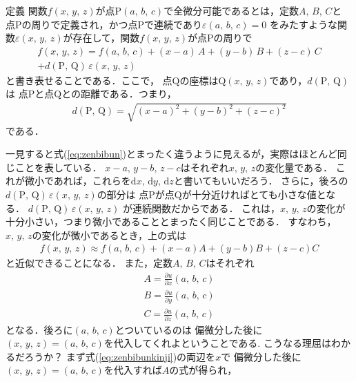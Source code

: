 \begin{itembox}[l]{定義}
関数$f(x, \, y, \, z)$が点$\mathrm{P}(a, \, b, \, c)$で全微分可能であるとは，定数$A, \, B, \, C$と
点$\mathrm{P}$の周りで定義され，かつ点$\mathrm{P}$で連続であり$\varepsilon(a, \, b, \, c)=0$
をみたすような関数$\varepsilon(x, \, y, \, z)$が存在して，関数$f(x, \, y, \, z)$が点$\mathrm{P}$の周りで
\begin{align*}
f(x, \, y, \, z) = f(a, \, b, \, c) + (x- a) \, A + (y-b) \, B + (z-c) \, C \\
+ d (\mathrm{P}, \, \mathrm{Q}) \,  \varepsilon(x, \, y, \, z)
\end{align*}
と書き表せることである．ここで，
点$\mathrm{Q}$の座標は$\mathrm{Q}(x, \, y, \, z)$であり，$d(\mathrm{P}, \, \mathrm{Q})$は
点$\mathrm{P}$と点$\mathrm{Q}$との距離である．つまり，
\begin{align*}
d( \mathrm{P} , \, \mathrm{Q} ) = \sqrt{ (x-a)^2+ (y-b)^2 + (z-c)^2 }
\end{align*}
である．
\end{itembox}
一見すると式(\ref{eq:zenbibun})とまったく違うように見えるが，実際はほとんど同じことを表している．
$x-a, \, y-b, \, z-c$はそれぞれ$x, \, y, \, z$の変化量である．
これが微小であれば，これらを$\mathrm{d}x, \, \mathrm{d}y, \, \mathrm{d}z$と書いてもいいだろう．
さらに，後ろの$d(\mathrm{P}, \, \mathrm{Q}) \, \varepsilon(x, \, y, \, z)$の部分は
点$\mathrm{P}$が点$\mathrm{Q}$が十分近ければとても小さな値となる．
$d(\mathrm{P}, \, \mathrm{Q}) \, \varepsilon(x, \, y, \, z)$
が連続関数だからである．
これは，$x, \, y, \, z$の変化が十分小さい，つまり微小であることとまったく同じことである．
すなわち，$x, \, y, \, z$の変化が微小であるとき，上の式は
\begin{eqnarray}
f(x, \, y, \, z) \approx f(a, \, b, \, c) + (x-a)A+(y-b)B+(z-c)C
\label{eq:zenbibunkinji}
\end{eqnarray}
と近似できることになる．
また，定数$A, \, B, \, C$はそれぞれ
\begin{eqnarray*}
A=\frac{\partial u}{\partial x} (a, \, b, \, c) \\
B=\frac{\partial u}{\partial y} (a, \, b, \, c) \\
C=\frac{\partial u}{\partial z} (a, \, b, \, c) 
\end{eqnarray*}
となる．後ろに$(a, \, b, \, c)$とついているのは
偏微分した後に$(x, \, y, \, z)=(a, \, b, \, c)$を代入してくれよということである.
こうなる理屈はわかるだろうか？ まず式(\ref{eq:zenbibunkinji})の両辺を$x$で
偏微分した後に$(x, \, y, \, z)=(a, \, b, \, c)$を代入すれば$A$の式が得られ，
